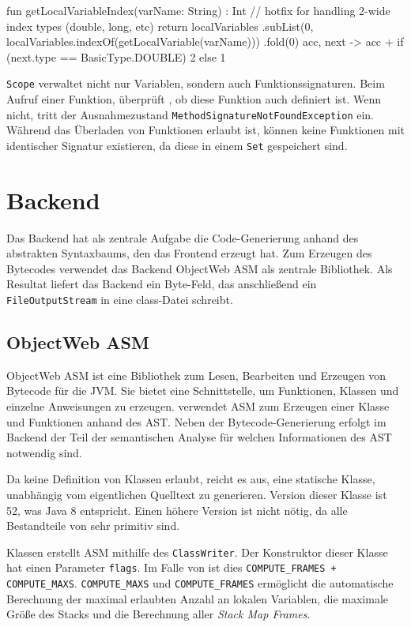 \begin{KotlinCode}[numbers=none, caption={Ermittlung des Index einer Variable in einem \texttt{Scope}}]
fun getLocalVariableIndex(varName: String) : Int {
    // hotfix for handling 2-wide index types (double, long, etc)
    return localVariables
        .subList(0, localVariables.indexOf(getLocalVariable(varName)))
        .fold(0) { acc, next ->
            acc + if (next.type == BasicType.DOUBLE) 2 else 1
        }
}
\end{KotlinCode}

\texttt{Scope} verwaltet nicht nur Variablen, sondern auch Funktionssignaturen. Beim Aufruf einer Funktion, überprüft \scope, ob diese Funktion auch definiert ist. Wenn nicht, tritt der Ausnahmezustand \texttt{MethodSignatureNotFoundException} ein. Während das Überladen von Funktionen erlaubt ist, können keine Funktionen mit identischer Signatur existieren, da diese in einem \texttt{Set} gespeichert sind.

\section{Backend}

Das Backend hat als zentrale Aufgabe die Code-Generierung anhand des abstrakten Syntaxbaums, den das Frontend erzeugt hat. Zum Erzeugen des Bytecodes verwendet das Backend ObjectWeb ASM als zentrale Bibliothek. Als Resultat liefert das Backend ein Byte-Feld, das anschließend ein \texttt{FileOutputStream} in eine class-Datei schreibt.

\subsection{ObjectWeb ASM}

ObjectWeb ASM ist eine Bibliothek zum Lesen, Bearbeiten und Erzeugen von Bytecode für die JVM. Sie bietet eine Schnittstelle, um Funktionen, Klassen und einzelne Anweisungen zu erzeugen. \toya verwendet ASM zum Erzeugen einer Klasse und Funktionen anhand des AST. Neben der Bytecode-Generierung erfolgt im Backend der Teil der semantischen Analyse für welchen Informationen des AST notwendig sind.

Da \toya keine Definition von Klassen erlaubt, reicht es aus, eine statische Klasse, unabhängig vom eigentlichen Quelltext zu generieren. Version dieser Klasse ist 52, was Java 8 entspricht. Einen höhere Version ist nicht nötig, da alle Bestandteile von \toya sehr primitiv sind.

Klassen erstellt ASM mithilfe des \texttt{ClassWriter}. Der Konstruktor dieser Klasse hat einen Parameter \texttt{flags}. Im Falle von \toya ist dies \texttt{COMPUTE\_FRAMES + COMPUTE\_MAXS}. \texttt{COMPUTE\_MAXS} und \texttt{COMPUTE\_FRAMES} ermöglicht die automatische Berechnung der maximal erlaubten Anzahl an lokalen Variablen, die maximale Größe des Stacks und die Berechnung aller \textit{Stack Map Frames}.


